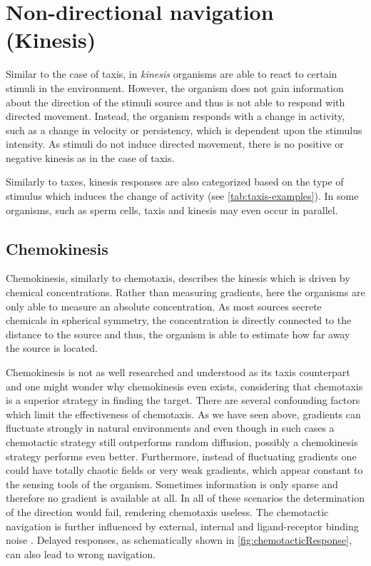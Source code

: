 \section{Non-directional navigation (Kinesis)}
Similar to the case of taxis, in \textit{kinesis} organisms are able to react to certain stimuli in the environment. However, the organism does not gain information about the direction of the stimuli source and thus is not able to respond with directed movement. Instead, the organism responds with a change in activity, such as a change in \eg velocity or persistency, which is dependent upon the stimulus intensity. As stimuli do not induce directed movement, there is no positive or negative kinesis as in the case of taxis.

Similarly to taxes, kinesis responses are also categorized based on the type of stimulus which induces the change of activity (see \autoref{tab:taxis-examples}). In some organisms, such as sperm cells, taxis and kinesis may even occur in parallel.

\subsection{Chemokinesis}
Chemokinesis, similarly to chemotaxis, describes the kinesis which is driven by chemical concentrations. Rather than measuring gradients, here the organisms are only able to measure an absolute concentration. As most sources secrete chemicals in spherical symmetry, the concentration is directly connected to the distance to the source and thus, the organism is able to estimate how far away the source is located.

Chemokinesis is not as well researched and understood as its taxis counterpart and one might wonder why chemokinesis even exists, considering that chemotaxis is a superior strategy in finding the target. There are several confounding factors which limit the effectiveness of chemotaxis. As we have seen above, gradients can fluctuate strongly in natural environments and even though in such cases a chemotactic strategy still outperforms random diffusion, possibly a chemokinesis strategy performs even better. Furthermore, instead of fluctuating gradients one could have totally chaotic fields or very weak gradients, which appear constant to the sensing tools of the organism. Sometimes information is only sparse and therefore no gradient is available at all. In all of these scenarios the determination of the direction would fail, rendering chemotaxis useless. The chemotactic navigation is further influenced by external, internal and ligand-receptor binding noise \cite{patnaik:2012}. Delayed responses, as schematically shown in \autoref{fig:chemotacticResponse}, can also lead to wrong navigation.

